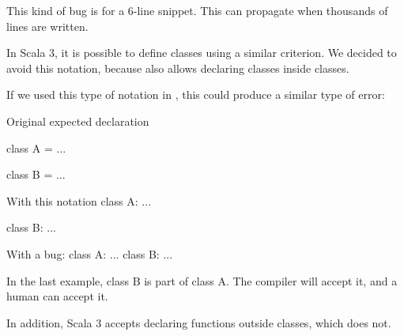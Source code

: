 This kind of bug is for a 6-line snippet.
This can propagate when thousands of lines are written.

In Scala 3, it is possible to define classes using a similar criterion.
We decided to avoid this notation, because \Soda also allows declaring classes inside classes.

If we used this type of notation in \Soda, this could produce a similar type of error:

Original expected declaration

class A = {
    ...
}

class B = {
    ...
}

With this notation
class A:
...

class B:
...

With a bug:
class A:
...
class B:
...

In the last example, class B is part of class A.
The compiler will accept it, and a human can accept it.

In addition, Scala 3 accepts declaring functions outside classes, which \Soda does not.

